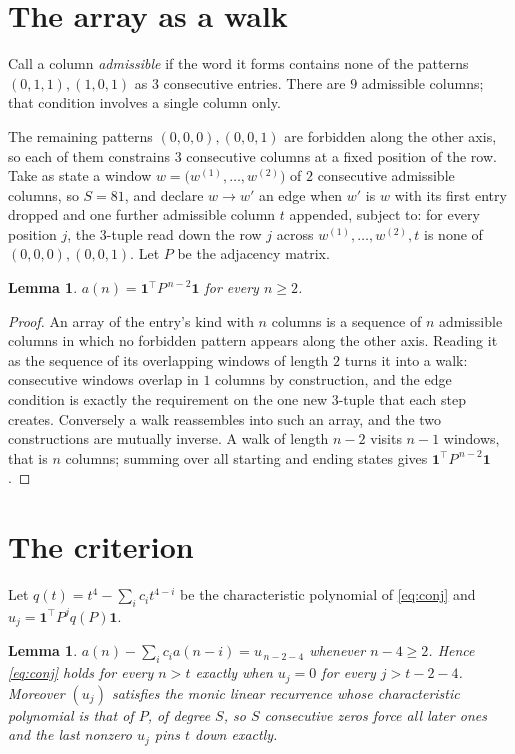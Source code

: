 \documentclass[11pt,a4paper]{article}
\theoremstyle{plain}
\newtheorem{lemma}[theorem]{Lemma}
\theoremstyle{definition}
\begin{document}
\section{The array as a walk}

Call a column \emph{admissible} if the word it forms contains none of the patterns
$(0,1,1), (1,0,1)$ as $3$ consecutive entries. There are $9$ admissible columns; that condition
involves a single column only.

The remaining patterns $(0,0,0), (0,0,1)$ are forbidden along the other axis, so each of them
constrains $3$ consecutive columns at a fixed position of the row. Take as state a
window $w=\bigl(w^{(1)},\dots,w^{(2)}\bigr)$ of $2$ consecutive admissible
columns, so $S=81$, and declare $w\to w'$ an edge when $w'$ is $w$ with its first entry
dropped and one further admissible column $t$ appended, subject to: for every position
$j$, the $3$-tuple read down the row $j$ across $w^{(1)},\dots,w^{(2)},t$
is none of $(0,0,0), (0,0,1)$. Let $P$ be the adjacency matrix.

\begin{lemma}\label{lem:walk}
$a(n)=\mathbf{1}^{\!\top}P^{\,n-2}\mathbf{1}$ for every $n\ge2$.
\end{lemma}

\begin{proof}
An array of the entry's kind with $n$ columns is a sequence of $n$ admissible columns in
which no forbidden pattern appears along the other axis. Reading it as the sequence of its
overlapping windows of length $2$ turns it into a walk: consecutive windows overlap in
$1$ columns by construction, and the edge condition is exactly the requirement on the one
new $3$-tuple that each step creates. Conversely a walk reassembles into such an array,
and the two constructions are mutually inverse. A walk of length $n-2$ visits $n-1$
windows, that is $n$ columns; summing over all starting and ending states gives
$\mathbf{1}^{\!\top}P^{\,n-2}\mathbf{1}$.
\end{proof}

\section{The criterion}

Let $q(t)=t^{4}-\sum_i c_i t^{4-i}$ be the characteristic polynomial of
\eqref{eq:conj} and $u_j=\mathbf{1}^{\!\top}P^{j}q(P)\mathbf{1}$.

\begin{lemma}\label{lem:crit}
$a(n)-\sum_i c_i a(n-i)=u_{\,n-2-4}$ whenever $n-4\ge2$. Hence
\eqref{eq:conj} holds for every $n>t$ exactly when $u_j=0$ for every
$j>t-2-4$. Moreover $(u_j)$ satisfies the monic linear recurrence whose
characteristic polynomial is that of $P$, of degree $S$, so $S$ consecutive zeros force all
later ones and the last nonzero $u_j$ pins $t$ down exactly.
\end{lemma}
\end{document}
